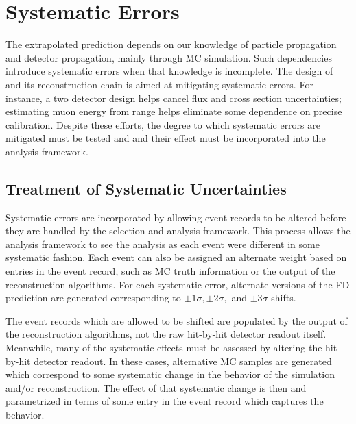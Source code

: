 \chapter{Systematic Errors}
\label{systs_chapter}

The extrapolated prediction depends on our knowledge of particle propagation
and detector propagation, mainly through MC simulation.
Such dependencies introduce systematic errors when that knowledge is incomplete.
The design of \nova and its reconstruction chain is aimed at mitigating
systematic errors.
For instance, a two detector design helps
cancel flux and cross section uncertainties; estimating muon energy
from range helps eliminate some dependence on precise calibration.
Despite these efforts, the degree to which systematic errors are mitigated
must be tested and and their effect must be incorporated into the
analysis framework.


\section{Treatment of Systematic Uncertainties}

Systematic errors are incorporated by allowing
event records to be altered before they are handled by the
selection and analysis framework.
This process allows the analysis framework to see the analysis as each
event were different in some systematic fashion.
Each event can also be assigned an alternate weight based
on entries in the event record, such as MC truth information or
the output of the reconstruction algorithms.
For each systematic error, alternate versions of the FD prediction
are generated corresponding to $\pm 1\sigma, \pm2\sigma,$ and
$\pm3\sigma$ shifts.

The event records which are allowed to be shifted are populated by
the output of the reconstruction algorithms,
not the raw hit-by-hit detector readout itself.
Meanwhile, many of the systematic effects must be assessed by altering the
hit-by-hit detector readout.
In these cases, alternative MC samples are generated which
correspond to some systematic change in the behavior of the
simulation and/or reconstruction.
The effect of that systematic change is then
and parametrized in terms of some entry in the event record which
captures the behavior.

